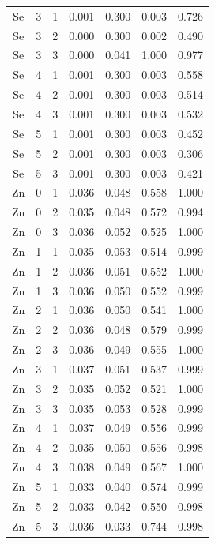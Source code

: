 \documentclass[ms, hidelinks]{uncgdissertationexp}
\theoremstyle{plain}
\theoremstyle{definition}
\theoremstyle{remark}
\begin{document}
\begin{longtable}{ccccccc}
Se & 3 & 1 & 0.001 & 0.300 & 0.003 & 0.726\\
\rowcolor{gray!6}  Se & 3 & 2 & 0.000 & 0.300 & 0.002 & 0.490\\
Se & 3 & 3 & 0.000 & 0.041 & 1.000 & 0.977\\
\rowcolor{gray!6}  Se & 4 & 1 & 0.001 & 0.300 & 0.003 & 0.558\\
Se & 4 & 2 & 0.001 & 0.300 & 0.003 & 0.514\\
\rowcolor{gray!6}  Se & 4 & 3 & 0.001 & 0.300 & 0.003 & 0.532\\
Se & 5 & 1 & 0.001 & 0.300 & 0.003 & 0.452\\
\rowcolor{gray!6}  Se & 5 & 2 & 0.001 & 0.300 & 0.003 & 0.306\\
Se & 5 & 3 & 0.001 & 0.300 & 0.003 & 0.421\\
\rowcolor{gray!6}  Zn & 0 & 1 & 0.036 & 0.048 & 0.558 & 1.000\\
Zn & 0 & 2 & 0.035 & 0.048 & 0.572 & 0.994\\
\rowcolor{gray!6}  Zn & 0 & 3 & 0.036 & 0.052 & 0.525 & 1.000\\
Zn & 1 & 1 & 0.035 & 0.053 & 0.514 & 0.999\\
\rowcolor{gray!6}  Zn & 1 & 2 & 0.036 & 0.051 & 0.552 & 1.000\\
Zn & 1 & 3 & 0.036 & 0.050 & 0.552 & 0.999\\
\rowcolor{gray!6}  Zn & 2 & 1 & 0.036 & 0.050 & 0.541 & 1.000\\
Zn & 2 & 2 & 0.036 & 0.048 & 0.579 & 0.999\\
\rowcolor{gray!6}  Zn & 2 & 3 & 0.036 & 0.049 & 0.555 & 1.000\\
Zn & 3 & 1 & 0.037 & 0.051 & 0.537 & 0.999\\
\rowcolor{gray!6}  Zn & 3 & 2 & 0.035 & 0.052 & 0.521 & 1.000\\
Zn & 3 & 3 & 0.035 & 0.053 & 0.528 & 0.999\\
\rowcolor{gray!6}  Zn & 4 & 1 & 0.037 & 0.049 & 0.556 & 0.999\\
Zn & 4 & 2 & 0.035 & 0.050 & 0.556 & 0.998\\
\rowcolor{gray!6}  Zn & 4 & 3 & 0.038 & 0.049 & 0.567 & 1.000\\
Zn & 5 & 1 & 0.033 & 0.040 & 0.574 & 0.999\\
\rowcolor{gray!6}  Zn & 5 & 2 & 0.033 & 0.042 & 0.550 & 0.998\\
Zn & 5 & 3 & 0.036 & 0.033 & 0.744 & 0.998\\*
\end{longtable}
\clearpage
\end{document}
